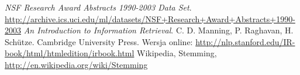 \documentclass[a4paper,12pt]{article}
\begin{document}

\begin{thebibliography}{9}

   \emph{NSF Research Award Abstracts 1990-2003 Data Set}.
   \url{http://archive.ics.uci.edu/ml/datasets/NSF+Research+Award+Abstracts+1990-2003}
	\emph{An Introduction to Information Retrieval}. 
	C. D. Manning, P. Raghavan, H. Sch\"utze.
	Cambridge University Press.
	Wersja online: \url{http://nlp.stanford.edu/IR-book/html/htmledition/irbook.html}
	Wikipedia, Stemming, \url{http://en.wikipedia.org/wiki/Stemming}

\end{thebibliography}
\end{document}

